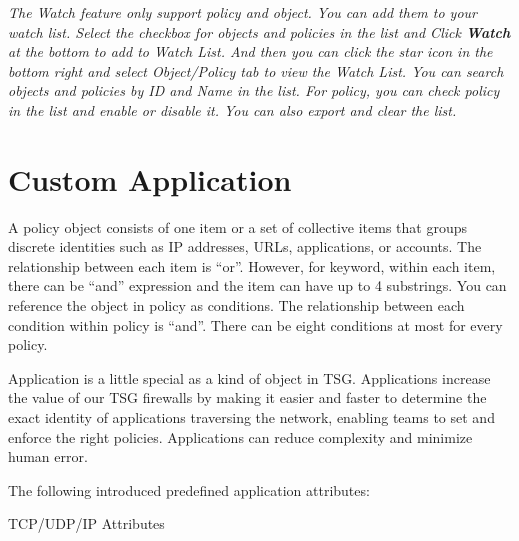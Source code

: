 \notemark\textit{The Watch feature only support policy and object. You can add them to your watch list. Select the checkbox for objects and policies in the list and Click \textbf{Watch} at the bottom to add to Watch List. And then you can click the star icon in the bottom right and select Object/Policy tab to view the Watch List. You can search objects and policies by ID and Name in the list. For policy, you can check policy in the list and enable or disable it. You can also export and clear the list.}

\section*{\hypertarget{link:Custom Application}{Custom Application}}
\label{sec:appendix_f:application}

A policy object consists of one item or a set of collective items that groups discrete identities such as IP addresses, URLs, applications, or accounts. The relationship between each item is “or”. However, for keyword, within each item, there can be “and” expression and the item can have up to 4 substrings. You can reference the object in policy as conditions. The relationship between each condition within policy is “and”. There can be eight conditions at most for every policy.


Application is a little special as a kind of object in TSG. Applications increase the value of our TSG firewalls by making it easier and faster to determine the exact identity of applications traversing the network, enabling teams to set and enforce the right policies. Applications can reduce complexity and minimize human error. 


The following introduced predefined application attributes:


TCP/UDP/IP Attributes

